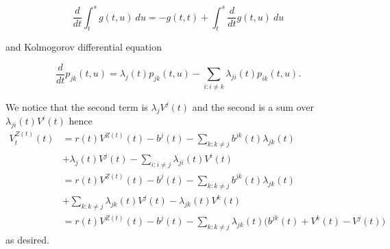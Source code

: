 \documentclass[a4paper,12pt,openany]{book}
\begin{document}
\[
\frac{d}{dt}\int_t^s g(t,u)\ du=-g(t,t)+\int_t^s\frac{d}{dt}g(t,u)\ du
\]

and Kolmogorov differential equation

\[
\frac{d}{dt}p_{jk}(t,u)=\lambda_{j}(t)p_{jk}(t,u)-\sum_{i:i\ne k}\lambda_{ji}(t)p_{ik}(t,u).
\]

We notice that the second term is \(\lambda_jV^j(t)\) and the second is a sum over \(\lambda_{ji}(t)V^i(t)\) hence
\begin{align*}
V_t^{Z(t)}(t)&=r(t)V^{Z(t)}(t)-b^j(t)-\sum_{k :k \ne j}  b^{jk}(t)\lambda_{jk }(t)\\
&+\lambda_j(t)V^j(t)-\sum_{i:i\ne j}\lambda_{ji}(t)V^i(t)\\
&=r(t)V^{Z(t)}(t)-b^j(t)-\sum_{k :k \ne j}  b^{jk}(t)\lambda_{jk }(t)\\
&+\sum_{k:k\ne j}\lambda_{jk}(t)V^j(t)-\lambda_{jk}(t)V^k(t)\\
&=r(t)V^{Z(t)}(t)-b^j(t)-\sum_{k :k \ne j}\lambda_{jk }(t)\Big(b^{jk}(t)+V^k(t)-V^j(t)\Big)
\end{align*}
as desired.
\end{document}
